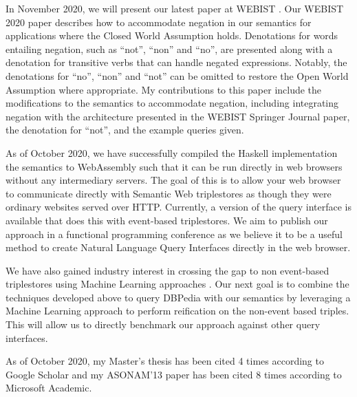 \documentclass[../main.tex]{subfiles}
\begin{document}
\begin{refsection}
    In November 2020, we will present our latest paper at WEBIST \cite{peelarfrostwebist2020}.  Our WEBIST 2020 paper describes how to accommodate negation in our semantics for applications where the Closed World Assumption holds.  Denotations for words entailing negation, such as ``not'', ``non'' and ``no'', are presented along with a denotation for transitive verbs that can handle negated expressions.  Notably, the denotations for ``no'', ``non'' and ``not'' can be omitted to restore the Open World Assumption where appropriate.
    My contributions to this paper include the modifications to the semantics to accommodate negation, including integrating negation with the architecture presented in the WEBIST Springer Journal paper, the denotation for ``not'', and the example queries given.

    As of October 2020, we have successfully compiled the Haskell implementation the semantics to WebAssembly such that it can be run directly in web browsers without any intermediary servers.  The goal of this is to allow your web browser to communicate directly with Semantic Web triplestores as though they were ordinary websites served over HTTP.  Currently, a version of the query interface is available that does this with event-based triplestores.  We aim to publish our approach in a functional programming conference as we believe it to be a useful method to create Natural Language Query Interfaces directly in the web browser.

    We have also gained industry interest in crossing the gap to non event-based triplestores using Machine Learning approaches \cite{timbr}.  Our next goal is to combine the techniques developed above to query DBPedia with our semantics by leveraging a Machine Learning approach to perform reification on the non-event based triples.  This will allow us to directly benchmark our approach against other query interfaces.

    As of October 2020, my Master's thesis \cite{peelar2016accommodating} has been cited 4 times according to Google Scholar and my ASONAM'13 paper has been cited 8 times according to Microsoft Academic.



\end{refsection}
\end{document}
